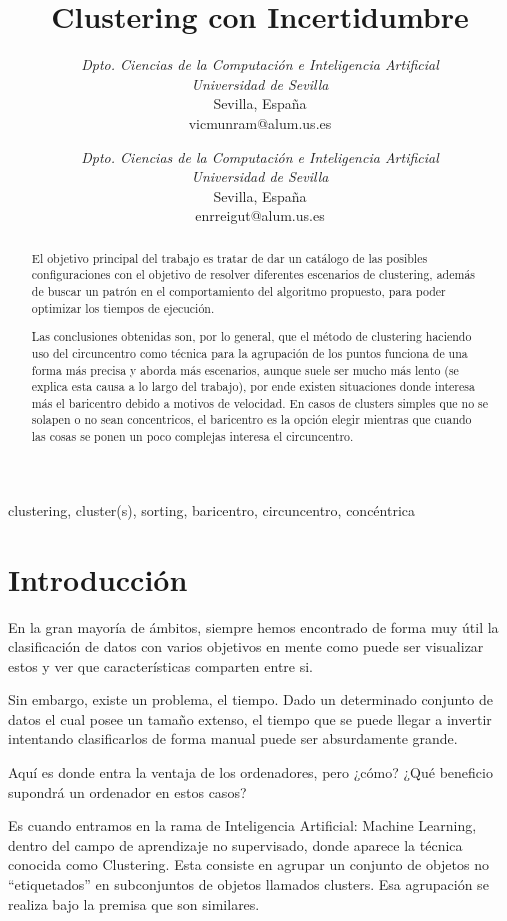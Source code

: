 \documentclass[conference,a4paper]{IEEEtran}
\title{Clustering con Incertidumbre}
\author
{
	\IEEEauthorblockN{Víctor Muñoz Ramírez}
	\IEEEauthorblockA
	{
		\textit{Dpto. Ciencias de la Computación e Inteligencia Artificial}\\
		\textit{Universidad de Sevilla}\\
		Sevilla, España\\
		vicmunram@alum.us.es
	}
	\and	
	\IEEEauthorblockN{Enrique Reina Gutiérrez}
	\IEEEauthorblockA
	{
		\textit{Dpto. Ciencias de la Computación e Inteligencia Artificial}\\
		\textit{Universidad de Sevilla}\\
		Sevilla, España\\
		enrreigut@alum.us.es
	}
}
\begin{document}
\maketitle


\begin{abstract}
El objetivo principal del trabajo es tratar de dar un catálogo de las posibles configuraciones con el objetivo de resolver diferentes escenarios de clustering, además de buscar un patrón en el comportamiento del algoritmo propuesto, para poder optimizar los tiempos de ejecución.

Las conclusiones obtenidas son, por lo general, que el método de clustering haciendo uso del circuncentro como técnica para la agrupación de los puntos funciona de una forma más precisa y aborda más escenarios, aunque suele ser mucho más lento (se explica esta causa a lo largo del trabajo), por ende existen situaciones donde interesa más el baricentro debido a motivos de velocidad. En casos de clusters simples que no se solapen o no sean concentricos, el baricentro es la opción elegir mientras que cuando las cosas se ponen un poco complejas interesa el circuncentro.
\end{abstract}

\begin{IEEEkeywords}
clustering, cluster(s), sorting, baricentro, circuncentro, concéntrica
\end{IEEEkeywords}

\section{Introducción}

En la gran mayoría de ámbitos, siempre hemos encontrado de forma muy útil la clasificación de datos con varios objetivos en mente como puede ser visualizar estos y ver que características comparten entre si.

Sin embargo, existe un problema, el tiempo. Dado un determinado conjunto de datos el cual posee un tamaño extenso, el tiempo que se puede llegar a invertir intentando clasificarlos de forma manual puede ser absurdamente grande.

Aquí es donde entra la ventaja de los ordenadores, pero ¿cómo? ¿Qué beneficio supondrá un ordenador en estos casos? 

Es cuando entramos en la rama de Inteligencia Artificial: Machine Learning, dentro del campo de aprendizaje no supervisado, donde aparece la técnica conocida como Clustering. Esta consiste en agrupar un conjunto de objetos no “etiquetados” en subconjuntos de objetos llamados clusters. Esa agrupación se realiza bajo la premisa que son similares.
\end{document}
